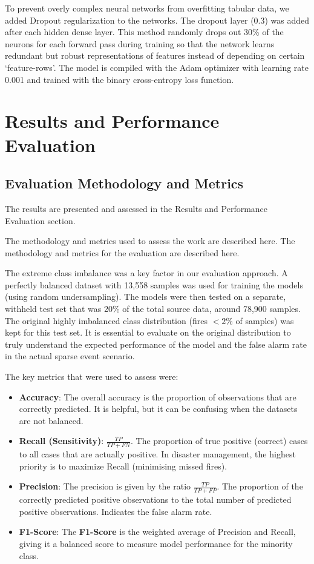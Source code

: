 \documentclass[journal, 10pt, twocolumn]{IEEEtran}
\begin{document}
To prevent overly complex neural networks from overfitting tabular data, we added Dropout regularization \cite{b38} to the networks. The dropout layer (0.3) was added after each hidden dense layer. This method randomly drops out 30\% of the neurons for each forward pass during training so that the network learns redundant but robust representations of features instead of depending on certain `feature-rows'. The model is compiled with the Adam optimizer with learning rate 0.001 and trained with the binary cross-entropy loss function.



\section{Results and Performance Evaluation}

\subsection{Evaluation Methodology and Metrics}
The results are presented and assessed in the Results and Performance Evaluation section.

The methodology and metrics used to assess the work are described here. The methodology and metrics for the evaluation are described here.

The extreme class imbalance was a key factor in our evaluation approach. A perfectly balanced dataset with 13,558 samples was used for training the models (using random undersampling). The models were then tested on a separate, withheld test set that was 20\% of the total source data, around 78,900 samples. The original highly imbalanced class distribution (fires $<2\%$ of samples) was kept for this test set. It is essential to evaluate on the original distribution to truly understand the expected performance of the model and the false alarm rate in the actual sparse event scenario.

The key metrics that were used to assess were:

\begin{itemize}
    \item \textbf{Accuracy}: The overall accuracy is the proportion of observations that are correctly predicted. It is helpful, but it can be confusing when the datasets are not balanced.

    \item \textbf{Recall (Sensitivity)}: $\frac{TP}{TP + FN}$. The proportion of true positive (correct) cases to all cases that are actually positive. In disaster management, the highest priority is to maximize Recall (minimising missed fires).

    \item \textbf{Precision}: The precision is given by the ratio $\frac{TP}{TP + FP}$. The proportion of the correctly predicted positive observations to the total number of predicted positive observations. Indicates the false alarm rate.

    \item \textbf{F1-Score}: The \textbf{F1-Score} is the weighted average of Precision and Recall, giving it a balanced score to measure model performance for the minority class.
\end{itemize}
\end{document}
